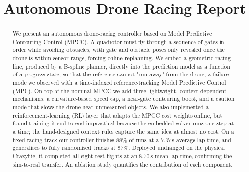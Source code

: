 \documentclass[conference]{IEEEtran}
\begin{document}
\title{Autonomous Drone Racing Report}

\author{
\and
{}
}

\maketitle

\begin{abstract}
We present an autonomous drone-racing controller based on Model Predictive
Contouring Control (MPCC). A quadrotor must fly through a sequence of gates in
order while avoiding obstacles, with gate and obstacle poses only revealed once
the drone is within sensor range, forcing online replanning. We embed a
geometric racing line, produced by a B-spline planner, directly into the
prediction model as a function of a progress state, so that the reference cannot
"run away" from the drone, a failure mode we observed with a time-indexed
reference-tracking Model Predictive Control (MPC). On top of the nominal MPCC we add three lightweight,
context-dependent mechanisms: a curvature-based speed cap, a near-gate
contouring boost, and a caution mode that slows the drone near unmeasured
objects. We also implemented a reinforcement-learning (RL) layer that adapts the
MPCC cost weights online, but found training it end-to-end impractical because the
embedded solver runs one step at a time; the hand-designed context rules capture
the same idea at almost no cost. On a fixed racing track our controller finishes
$88\%$ of runs at a $7.37\,\mathrm{s}$ average lap time, and generalises to
fully randomised tracks at $87\%$. Deployed unchanged on the physical
Crazyflie, it completed all eight test flights at an $8.70\,\mathrm{s}$ mean lap
time, confirming the sim-to-real transfer. An ablation study quantifies the
contribution of each component.
\end{abstract}
\end{document}
